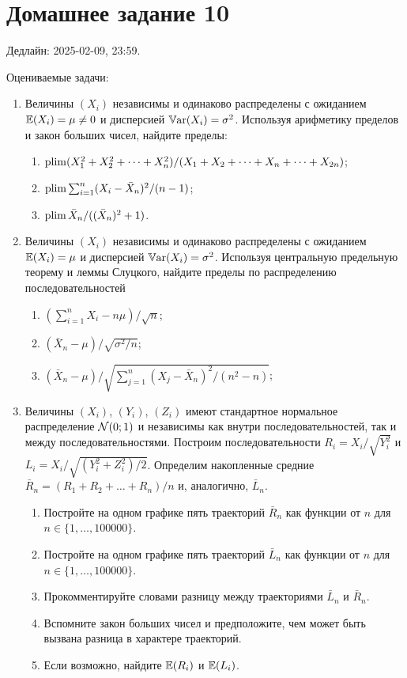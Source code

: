 \section*{Домашнее задание 10}


Дедлайн: 2025-02-09, 23:59.

Оцениваемые задачи:

\begin{enumerate}

\item Величины $(X_i)$ независимы и одинаково распределены с ожиданием $\operatorname{\mathbb{E}}(X_i) = \mu \neq 0$ и дисперсией $\operatorname{\mathbb{V}ar}(X_i) = \sigma^2$.
Используя арифметику пределов и закон больших чисел, найдите пределы:
\begin{enumerate}
    \item $\operatorname{plim} (X_1^2 + X_2^2 + \dots + X_n^2) / (X_1 + X_2 + \dots + X_n + \dots + X_{2n})$;
    \item $\operatorname{plim} \sum_{i=1}^n (X_i - \bar X_n)^2 / (n - 1)$;
    \item $\operatorname{plim} \bar X_n / ((\bar X_n)^2 + 1)$.
\end{enumerate}


\item Величины $(X_i)$ независимы и одинаково распределены с ожиданием $\operatorname{\mathbb{E}}(X_i) = \mu$ и дисперсией $\operatorname{\mathbb{V}ar}(X_i) = \sigma^2$.
Используя центральную предельную теорему и леммы Слуцкого, найдите пределы по распределению последовательностей 
\begin{enumerate}
    \item $(\sum_{i=1}^n X_i  -  n\mu) /\sqrt{n}$;
    \item $(\bar X_n - \mu) / \sqrt{\sigma^2/n}$;
    \item $(\bar X_n - \mu) / \sqrt{\sum_{j=1}^n (X_j - \bar X_n)^2 / (n^2 - n)}$;
\end{enumerate}


\item Величины $(X_i)$, $(Y_i)$, $(Z_i)$ имеют стандартное нормальное распределение $\mathcal{N}(0; 1)$ и независимы как внутри последовательностей, так и между последовательностями.
Построим последовательности $R_i = X_i / \sqrt{Y_i^2}$ и $L_i = X_i /\sqrt{(Y_i^2 + Z_i^2)/2}$.
Определим накопленные средние $\bar R_n = (R_1 + R_2 + \dots + R_n) / n$ и, аналогично, $\bar L_n$.

\begin{enumerate}
    \item Постройте на одном графике пять траекторий $\bar R_n$ как функции от $n$ для $n \in \{1, \dots, 100000\}$.
    \item Постройте на одном графике пять траекторий $\bar L_n$ как функции от $n$ для $n \in \{1, \dots, 100000\}$.
    \item Прокомментируйте словами разницу между траекториями $\bar L_n$ и $\bar R_n$.
    \item Вспомните закон больших чисел и предположите, чем может быть вызвана разница в характере траекторий.
    \item Если возможно, найдите $\operatorname{\mathbb{E}}(R_i)$ и $\operatorname{\mathbb{E}}(L_i)$.
\end{enumerate}


\end{enumerate}
